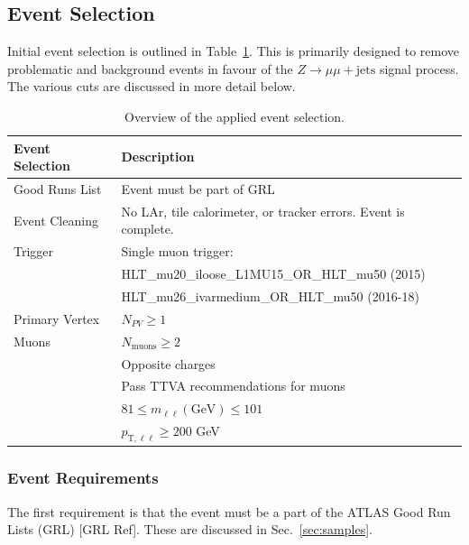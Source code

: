 \subsection{Event Selection}
\label{sec:selection}

Initial event selection is outlined in Table~\ref{lab:eventsel}. This is primarily designed to remove problematic and background events in favour of the $Z\rightarrow\mu\mu + \text{jets}$ signal process. The various cuts are discussed in more detail below.

\begin{table}[h!]
    \centering
    \begin{tabular}{l|l}
         \hline
    \textbf{Event Selection} & \textbf{Description} \\ \hline
    Good Runs List & Event must be part of GRL \\ \hline
    Event Cleaning & No LAr, tile calorimeter, or tracker errors. Event is complete. \\ \hline
    Trigger & Single muon trigger: \\
    & HLT\_mu20\_iloose\_L1MU15\_OR\_HLT\_mu50 (2015) \\
    & HLT\_mu26\_ivarmedium\_OR\_HLT\_mu50 (2016-18) \\ \hline
    Primary Vertex & $N_{PV}\geq1$ \\ \hline
    Muons & $N_{\text{muons}}\geq2$ \\
          & Opposite charges \\
          & Pass TTVA recommendations for muons \\
          & $81\leq m_{\ell\ell} (\text{GeV})\leq 101$ \\
          & $p_{\text{T},\ell\ell}\geq200$ GeV \\ \hline
    \end{tabular}
    \caption{Overview of the applied event selection.}
    \label{lab:eventsel}
\end{table}

\subsubsection{Event Requirements}
The first requirement is that the event must be a part of the ATLAS Good Run Lists (GRL) [GRL Ref]. These are discussed in Sec.~\ref{sec:samples}.

